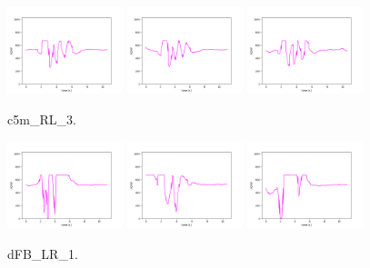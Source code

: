 \begin{figure}[!ht]
\begin{center}
\includegraphics[width=0.3\textwidth]{../data/c5m_RL_3/c5m_RL_3_1.png}
\includegraphics[width=0.3\textwidth]{../data/c5m_RL_3/c5m_RL_3_2.png}
\includegraphics[width=0.3\textwidth]{../data/c5m_RL_3/c5m_RL_3_3.png}
\caption{c5m\_RL\_3.\label{fig:c5m_RL_3}}
\end{center}
\end{figure}

\begin{figure}[!ht]
\begin{center}
\includegraphics[width=0.3\textwidth]{../data/dFB_LR_1/dFB_LR_1_1.png}
\includegraphics[width=0.3\textwidth]{../data/dFB_LR_1/dFB_LR_1_2.png}
\includegraphics[width=0.3\textwidth]{../data/dFB_LR_1/dFB_LR_1_3.png}
\caption{dFB\_LR\_1.\label{fig:dFB_LR_1}}
\end{center}
\end{figure}

